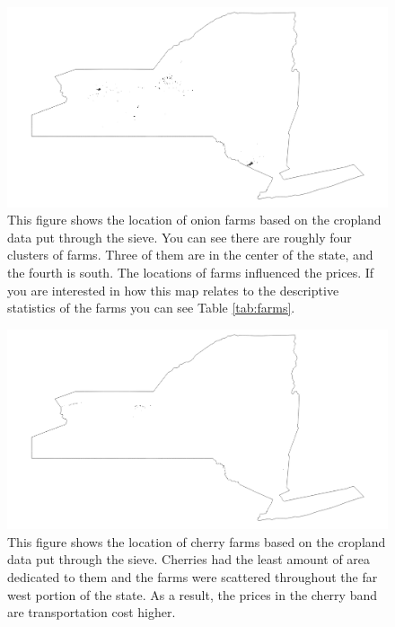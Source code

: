 \documentclass{report}
\begin{document}

\begin{figure}
\centering
\begin{framed}
\includegraphics[scale=.50]{farms_49}
\caption{This figure shows the location of onion farms based on the cropland data put through the sieve. You can see there are roughly four clusters of farms. Three of them are in the center of the state, and the fourth is south. The locations of farms influenced the prices. If you are interested in how this map relates to the descriptive statistics of the farms you can see Table \ref{tab:farms}.}
\label{fig:farms_49}
\end{framed}
\end{figure}

\begin{figure}
\centering
\begin{framed}
\includegraphics[scale=.50]{farms_66}
\caption{This figure shows the location of cherry farms based on the cropland data put through the sieve. Cherries had the least amount of area dedicated to them and the farms were scattered throughout the far west portion of the state. As a result, the prices in the cherry band are transportation cost higher.}
\label{fig:farms_66}
\end{framed}
\end{figure}
\end{document}
